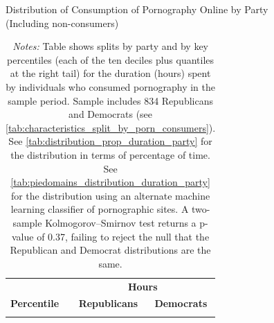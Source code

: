 \documentclass[12pt, letterpaper]{article}
\begin{document}
\begin{table}[ht] \centering \small \setlength\tabcolsep{10 pt}
	\caption{Distribution of Consumption of Pornography Online by Party\\ (Including non-consumers)}
	\label{tab:distribution_duration_party_untruncated}
	\begin{adjustbox}{max width=\textwidth}
		\begin{tabular}{crr}
			\toprule
			\multicolumn{1}{l}{\textbf{}}&\multicolumn{2}{c}{\textbf{Hours}}\\
			\cmidrule(l){2-3}
			\multicolumn{1}{l}{\textbf{Percentile}}&\multicolumn{1}{c}{\textbf{Republicans}}&\multicolumn{1}{c}{\textbf{Democrats}}\\
			\midrule
			\\
			\bottomrule
		\end{tabular}
	\end{adjustbox}
	\caption*{\footnotesize \emph{Notes:} 
		Table shows splits by party and by key percentiles (each of the ten deciles plus quantiles at the right tail) for the duration (hours) spent by individuals who consumed pornography in the sample period. 
		Sample includes 834 Republicans and Democrats (see \cref{tab:characteristics_split_by_porn_consumers}).
		See \cref{tab:distribution_prop_duration_party} for the distribution in terms of percentage of time. 
		See \cref{tab:piedomains_distribution_duration_party} for the distribution using an alternate machine learning classifier of pornographic sites. 
		A two-sample Kolmogorov–Smirnov test returns a p-value of 0.37, failing to reject the null that the Republican and Democrat distributions are the same.
	}
\end{table}
\end{document}
